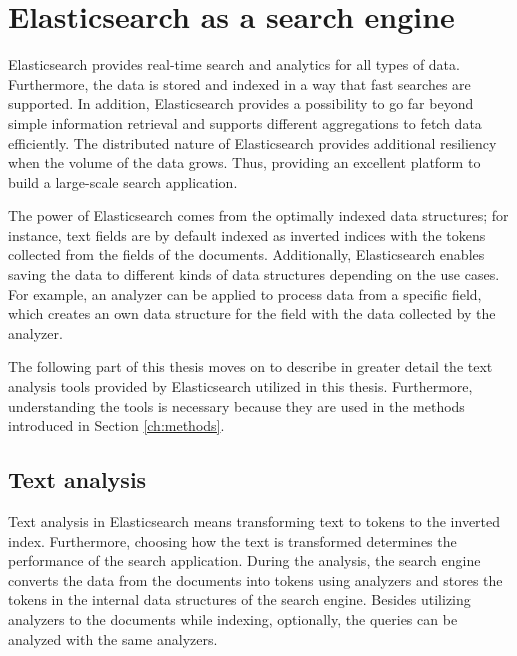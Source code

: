 
\section{Elasticsearch as a search engine}
\label{sec:elasticsearch}

Elasticsearch provides real-time search and analytics for all types of data.
Furthermore, the data is stored and indexed in a way that fast searches are supported.
In addition, Elasticsearch provides a possibility to go far beyond simple information retrieval and supports
different aggregations to fetch data efficiently. 
The distributed nature of Elasticsearch provides additional resiliency when the volume of the data 
grows. 
Thus, providing an excellent platform to build a large-scale search application.
\cite{elasticIntro}


The power of Elasticsearch comes from the optimally indexed data structures; for instance, text fields are by default
indexed as inverted indices with the tokens collected from the fields of the documents.
Additionally, Elasticsearch enables saving the data to different kinds of data structures depending on the use cases.
For example, an analyzer can be applied to process data from a specific field,
which creates an own data structure for the field with the data collected by the analyzer.
\cite{elasticIntro}


The following part of this thesis moves on to describe in greater detail 
the text analysis tools provided by Elasticsearch utilized in this thesis.
Furthermore, understanding the tools is necessary because they are used in 
the methods introduced in Section \ref{ch:methods}.



\subsection{Text analysis}
\label{ss:textAnalysisTools}

Text analysis in Elasticsearch means transforming text to tokens to the inverted index.
Furthermore, choosing how the text is transformed determines the performance of the search application.
During the analysis, the search engine converts the data from the documents into tokens using analyzers
and stores the tokens in the internal data structures of the search engine.
Besides utilizing analyzers to the documents while indexing, optionally, 
the queries can be analyzed with the same analyzers.
\cite{relevantSearch}

